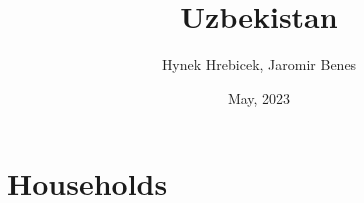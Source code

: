 \documentclass[14pt]{beamer}
\title{Uzbekistan}
\institute{DSGE model for an open economy}
\author{Hynek Hrebicek, Jaromir Benes}
\date{May, 2023}
\begin{document}
\maketitle


%
\section{Households}
  
\end{document}

